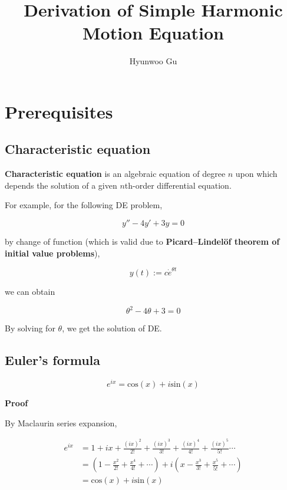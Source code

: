 \documentclass[12pt]{article}
\begin{document}
\title{\textbf{Derivation of Simple Harmonic Motion Equation}}
\author{Hyunwoo Gu}
\date{}

\maketitle

\section*{Prerequisites}

\subsection{Characteristic equation}

\textbf{Characteristic equation} is an algebraic equation of degree $n$ upon which depends the solution of a given $n$th-order differential equation. 

For example, for the following DE problem,

$$
y'' - 4y' + 3y = 0
$$

by change of function (which is valid due to \textbf{Picard–Lindelöf theorem of initial value problems}),

$$
y(t) := c \dot e^{\theta t}
$$

we can obtain

$$
\theta^2 - 4\theta + 3 = 0
$$

By solving for $\theta$, we get the solution of DE. 

\subsection{Euler's formula}

$$
e^{ix} = \mathrm{cos}(x) + i \mathrm{sin}(x)
$$

\textbf{Proof}

By Maclaurin series expansion, 

$$
\begin{aligned}
e^{ix} &= 1 + ix + \frac{(ix)^2}{2!} + \frac{(ix)^3}{3!} + \frac{(ix)^4}{4!} + \frac{(ix)^5}{5!} \cdots \\[10pt]
&= \left( 1 - \frac{x^2}{2!} + \frac{x^4}{4!} + \cdots \right) + i\left(  x - \frac{x^3}{3!} + \frac{x^5}{5!}  + \cdots \right) \\[10pt]
&= \mathrm{cos}(x) + i \mathrm{sin}(x)
\end{aligned}
$$
\end{document}
